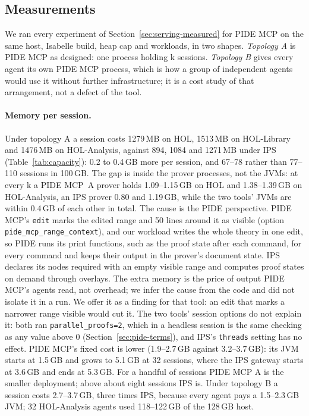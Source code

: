 \documentclass[11pt]{article}
\newcommand{\code}[1]{\colorbox{gray!12}{\texttt{\vphantom{Ag}#1}}}
\begin{document}
\subsection{Measurements}

We ran every experiment of Section~\ref{sec:serving-measured} for PIDE
MCP on the same host, Isabelle build, heap cap and workloads, in two
shapes. \emph{Topology A} is PIDE MCP as designed: one process holding k
sessions. \emph{Topology B} gives every agent its own PIDE MCP process,
which is how a group of independent agents would use it without further
infrastructure; it is a cost study of that arrangement, not a defect of
the tool.

\paragraph{Memory per session.} Under topology A a session costs
1279\,MB on HOL, 1513\,MB on HOL-Library and 1476\,MB on HOL-Analysis,
against 894, 1084 and 1271\,MB under IPS (Table~\ref{tab:capacity}):
0.2 to 0.4\,GB more per session, and 67--78 rather than 77--110 sessions
in 100\,GB. The gap is inside the prover processes, not the JVMs: at
every k a PIDE MCP~A prover holds 1.09--1.15\,GB on HOL and 1.38--1.39\,GB
on HOL-Analysis, an IPS prover 0.80 and 1.19\,GB, while the two tools' JVMs
are within 0.4\,GB of each other in total. The cause is the PIDE
perspective. PIDE MCP's \code{edit} marks the edited range and 50 lines
around it as visible (option \code{pide\_mcp\_range\_context}), and our
workload writes the whole theory in one edit, so PIDE runs its print
functions, such as the proof state after each command, for every command
and keeps their output in the prover's document state. IPS declares its
nodes required with an empty visible range and computes proof states on
demand through overlays. The extra memory is the price of output PIDE
MCP's agents read, not overhead; we infer the cause from the code and did
not isolate it in a run. We offer it as a finding for that tool: an edit
that marks a narrower range visible would cut it. The two tools' session options do not explain
it: both ran \code{parallel\_proofs=2}, which in a headless session is
the same checking as any value above 0 (Section~\ref{sec:pide-terms}),
and IPS's \code{threads} setting has no effect. PIDE MCP's fixed cost is lower (1.9--2.7\,GB against
3.2--3.7\,GB): its JVM starts at 1.5\,GB and grows to 5.1\,GB at 32
sessions, where the IPS gateway starts at 3.6\,GB and ends at 5.3\,GB.
For a handful of sessions PIDE MCP A is the smaller deployment; above
about eight sessions IPS is. Under topology B a session costs
2.7--3.7\,GB, three times IPS, because every agent pays a 1.5--2.3\,GB
JVM; 32 HOL-Analysis agents used 118--122\,GB of the 128\,GB host.
\end{document}
